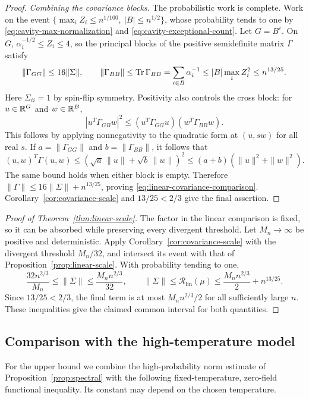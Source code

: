 \begin{proof}
\smallskip\noindent\emph{Combining the covariance blocks.}
The probabilistic work is complete. Work on the event
$\{\max_iZ_i\le n^{1/100},\ |B|\le n^{1/2}\}$, whose probability
tends to one by \eqref{eq:cavity-max-normalization} and
\eqref{eq:cavity-exceptional-count}.  Let $G=B^c$.
On $G$, $\alpha_i^{-1/2}\le Z_i\le4$, so the principal
blocks of the positive semidefinite matrix $\Gamma$ satisfy
\[
 \|\Gamma_{GG}\|\le16\|\Sigma\|,
 \qquad
 \|\Gamma_{BB}\|\le\operatorname{Tr}\Gamma_{BB}
 =\sum_{i\in B}\alpha_i^{-1}
 \le |B|\max_i Z_i^2\le n^{13/25}.
\]
Here $\Sigma_{ii}=1$ by spin-flip symmetry.  Positivity also controls the
cross block: for $u\in\mathbb R^G$ and $w\in\mathbb R^B$,
\[
 |u^T\Gamma_{GB}w|^2
 \le(u^T\Gamma_{GG}u)(w^T\Gamma_{BB}w).
\]
This follows by applying nonnegativity to the quadratic form at
$(u,sw)$ for all real $s$.  If
$a=\|\Gamma_{GG}\|$ and $b=\|\Gamma_{BB}\|$, it follows that
\[
 (u,w)^T\Gamma(u,w)
 \le(\sqrt a\,\|u\|+\sqrt b\,\|w\|)^2
 \le(a+b)(\|u\|^2+\|w\|^2).
\]
The same bound holds when either block is empty.  Therefore
$\|\Gamma\|\le16\|\Sigma\|+n^{13/25}$, proving
\eqref{eq:linear-covariance-comparison}.  Corollary~\ref{cor:covariance-scale}
and $13/25<2/3$ give the final assertion.
\end{proof}

\begin{proof}[Proof of Theorem~\ref{thm:linear-scale}]
The factor in the linear comparison is fixed, so it can be absorbed
while preserving every divergent threshold. Let $M_n\to\infty$ be
positive and deterministic. Apply Corollary~\ref{cor:covariance-scale}
with the divergent threshold
$M_n/32$, and intersect its event with that of
Proposition~\ref{prop:linear-scale}.  With probability tending to one,
\[
 \frac{32n^{2/3}}{M_n}\le\|\Sigma\|
 \le\frac{M_n n^{2/3}}{32},
 \qquad
 \|\Sigma\|\le\mathcal R_{\mathrm{lin}}(\mu)
 \le\frac{M_n n^{2/3}}2+n^{13/25}.
\]
Since $13/25<2/3$, the final term is at most
$M_nn^{2/3}/2$ for all sufficiently large $n$.  These inequalities
give the claimed common interval for both quantities.
\end{proof}

\subsection{Comparison with the high-temperature model}

For the upper bound we combine the high-probability norm estimate of
Proposition~\ref{prop:spectral} with the following fixed-temperature,
zero-field functional inequality. Its constant may depend on the chosen
temperature.

